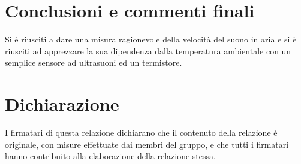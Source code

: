 \documentclass[10pt, a4paper, italian]{article}
\begin{document}
\section*{Conclusioni e commenti finali}
Si è riusciti a dare una misura ragionevole della velocità del suono in aria
e si è riusciti ad apprezzare la sua dipendenza dalla temperatura ambientale
con un semplice sensore ad ultrasuoni ed un termistore.

\section*{Dichiarazione}
I firmatari di questa relazione dichiarano che il contenuto della relazione \`e
originale, con misure effettuate dai membri del gruppo, e che tutti i firmatari
hanno contribuito alla elaborazione della relazione stessa.
\end{document}
